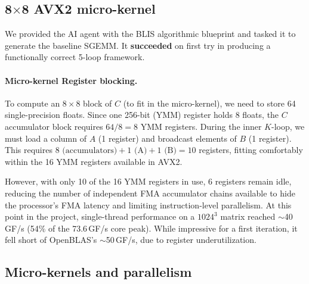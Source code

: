 \documentclass[11pt,a4paper]{article}
\begin{document}
\subsection{8$\times$8 AVX2 micro-kernel}

We provided the AI agent with the BLIS algorithmic blueprint and tasked it to generate the baseline SGEMM. 
It \textbf{succeeded} on first try in producing a functionally correct 5-loop framework. 

\paragraph{Micro-kernel Register blocking.}
To compute an $8 \times 8$ block of $C$ (to fit in the micro-kernel), we need to store 64 single-precision floats. Since one 256-bit (YMM) register holds 8 floats, the $C$ accumulator block requires $64 / 8 = 8$ YMM registers.
During the inner $K$-loop, we must load a column of $A$ (1 register) and broadcast elements of $B$ (1 register). This requires $8 \text{ (accumulators)} + 1 \text{ (A)} + 1 \text{ (B)} = 10$ registers, fitting comfortably within the 16 YMM registers available in AVX2.

However, with only 10 of the 16 YMM registers in use, 6 registers remain idle, reducing the number of independent FMA accumulator chains available to hide the processor's FMA latency and limiting instruction-level parallelism. At this point in the project, single-thread performance on a $1024^3$ matrix reached $\sim$40\,GF/s (54\% of the 73.6\,GF/s core peak). While impressive for a first iteration, it fell short of OpenBLAS's $\sim$50\,GF/s, due to register underutilization.

\subsection{Micro-kernels and parallelism}
\end{document}
